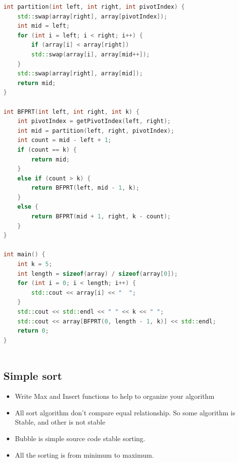 \documentclass[a4paper,11pt,twoside]{book}
\begin{document}
\begin{itemize}
\begin{lstlisting}[frame=single, language=c++, basicstyle=\scriptsize]
int partition(int left, int right, int pivotIndex) {
	std::swap(array[right], array[pivotIndex]);
	int mid = left;
	for (int i = left; i < right; i++) {
		if (array[i] < array[right])
		std::swap(array[i], array[mid++]);
	}
	std::swap(array[right], array[mid]);
	return mid;
}

int BFPRT(int left, int right, int k) {
	int pivotIndex = getPivotIndex(left, right);
	int mid = partition(left, right, pivotIndex);
	int count = mid - left + 1;
	if (count == k) {
		return mid;
	}
	else if (count > k) {
		return BFPRT(left, mid - 1, k);
	}
	else {
		return BFPRT(mid + 1, right, k - count);
	}
}

int main() {
	int k = 5;
	int length = sizeof(array) / sizeof(array[0]);
	for (int i = 0; i < length; i++) {
		std::cout << array[i] << "  ";
	}
	std::cout << std::endl << " " << k << " ";
	std::cout << array[BFPRT(0, length - 1, k)] << std::endl;
	return 0;
}
	
\end{lstlisting}

\end{itemize}

\subsection{Simple sort}
\begin{itemize}
\item Write Max and Insert functions to help to organize your algorithm
\item All sort algorithm don't compare equal relationship. So some algorithm is Stable, and other is not stable
\item Bubble is simple source code stable sorting. 
\item All the sorting is from minimum to maximum.
\end{itemize}
 
\end{document}
